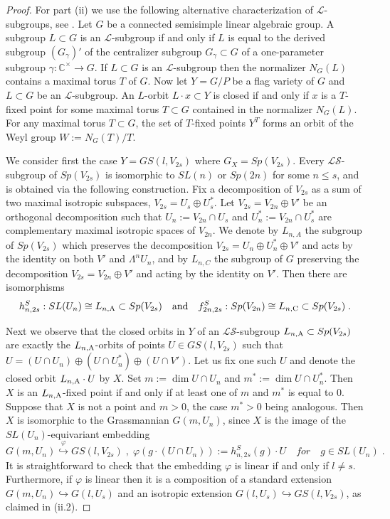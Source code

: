 \documentclass[12pt]{amsart}
\def\CC {{\mathbb C}}     %
\def\hw  {\hookrightarrow}
\def\mc {\mathcal}
\begin{document}
\begin{proof}
For part (ii) we use the following alternative characterization of $\mc L$-subgroups, see \cite[\S~30.2]{Humphreys}. Let $G$ be a connected semisimple linear algebraic group. A subgroup $L\subset G$ is an $\mc L$-subgroup if and only if $L$ is equal to the derived subgroup $(G_\gamma)'$ of the centralizer subgroup $G_\gamma\subset G$ of a one-parameter subgroup $\gamma:\CC^\times\to G$. If $L\subset G$ is an $\mc L$-subgroup then the normalizer $N_G(L)$ contains a maximal torus $T$ of $G$. Now let $Y=G/P$ be a flag variety of $G$ and $L\subset G$ be an ${\mc L}$-subgroup. An $L$-orbit $L\cdot x \subset Y$ is closed if and only if $x$ is a $T$-fixed point for some maximal torus $T\subset G$ contained in the normalizer $N_G(L)$. For any maximal torus $T\subset G$, the set of $T$-fixed points $Y^T$ forms an orbit of the Weyl group $W:=N_G(T)/T$.

We consider first the case $Y=GS(l,V_{2s})$ where $G_X=Sp(V_{2s})$. Every $\mc{LS}$-subgroup of $Sp(V_{2s})$ is isomorphic to $SL(n)$ or  $Sp(2n)$ for some $n\leq s$, and is obtained via the following construction. Fix a decomposition of $V_{2s}$ as a sum of two maximal isotropic subspaces, $V_{2s} = U_s\oplus U_s^*$. Let $V_{2s}=V_{2n}\oplus V'$ be an orthogonal decomposition such that $U_n:=V_{2n}\cap U_s$ and $U_n^*:=V_{2n}\cap U_s^*$ are complementary maximal isotropic spaces of $V_{2n}$. We denote by $L_{n,A}$ the subgroup of $Sp(V_{2s})$ which preserves the decomposition $V_{2s}=U_n\oplus U_n^*\oplus V'$ and acts by the identity on both $V'$ and $\Lambda^nU_n$, and by $L_{n,C}$ the subgroup of $G$ preserving the decomposition $V_{2s}=V_{2n}\oplus V'$ and acting by the identity on $V'$. Then there are isomorphisms
$$
h^S_{n,2s}:SL(U_n)\cong L_{n,{\rm A}} \subset Sp(V_{2s}) \quad{\rm and}\quad f^S_{2n,2s}:Sp(V_{2n})\cong L_{n,{\rm C}}\subset Sp(V_{2s}) \;.
$$

Next we observe that the closed orbits in $Y$ of an $\mc{LS}$-subgroup $L_{n,{\rm A}}\subset Sp(V_{2s})$ are exactly the $L_{n,{\rm A}}$-orbits of points $U\in GS(l,V_{2s})$ such that $U=(U\cap U_n)\oplus (U\cap U_n^*)\oplus (U\cap V')$. Let us fix one such $U$ and denote the closed orbit $L_{n,{\rm A}}\cdot U$ by $X$. Set $m:=\dim U\cap U_n$ and $m^*:=\dim U\cap U_n^*$. Then $X$ is an $L_{n,{\rm A}}$-fixed point if and only if at least one of $m$ and $m^*$ is equal to $0$. Suppose that $X$ is not a point and $m>0$, the case $m^*>0$ being analogous. Then $X$ is isomorphic to the Grassmannian $G(m,U_n)$, since $X$ is the image of the $SL(U_n)$-equivariant embedding
$$
G(m,U_n) \stackrel{\varphi}{\hookrightarrow} GS(l,V_{2s}) \;,\; \varphi(g\cdot (U\cap U_n)) := h^S_{n,2s}(g)\cdot U \quad for\quad g\in SL(U_n)\;.
$$
It is straightforward to check that the embedding $\varphi$ is linear if and only if $l\ne s$. Furthermore, if $\varphi$ is linear then it is a composition of a standard extension $G(m,U_n)\hw G(l,U_s)$ and an isotropic extension $G(l,U_s)\hw GS(l,V_{2s})$, as claimed in (ii.2).


\end{proof}
\end{document}
